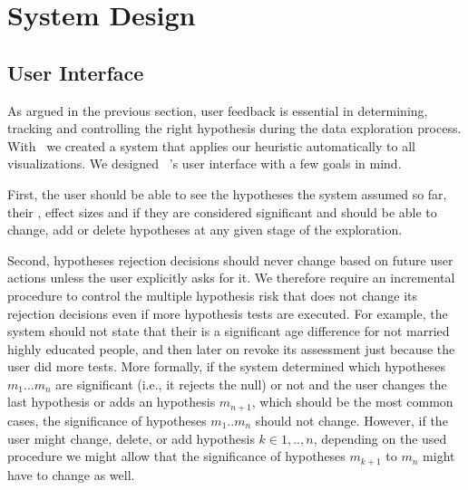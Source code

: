 \section{System Design}
\label{sec:system-design}

\subsection{User Interface}
\label{sec:ui}
As argued in the previous section, user feedback is essential in determining, tracking and controlling the right hypothesis during the data exploration process.
With \system~we created a system that applies our heuristic automatically to all visualizations. We designed \system~'s user interface with a few goals in mind.

First, the user should be able to see the hypotheses the system assumed so far, their \pvals, effect sizes and if they are considered significant and should be able to change, add or delete hypotheses at any given stage of the exploration. 

Second, hypotheses rejection decisions should never change based on future user actions unless the user explicitly asks for it. We therefore require an incremental procedure to control the multiple hypothesis risk that does not change its rejection decisions even if more hypothesis tests are executed.
For example, the system should not state that their is a significant age difference for not married highly educated people, and then later on revoke its assessment just because the user did more tests. 
More formally, if the system determined which hypotheses $m_1 ...  m_n$ are significant (i.e., it rejects the null) or not and the user changes the last hypothesis or adds an hypothesis $m_{n+1}$, which should be the most common cases, the significance of hypotheses $m_1..m_{n}$ should not change. 
However, if the user might change, delete, or add hypothesis $k \in {1,..,n}$, depending on the used procedure we might allow that the significance of hypotheses $m_{k+1}$ to $m_n$ might have to change as well.

